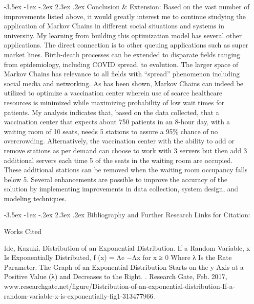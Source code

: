 \documentclass[11pt]{article}
\makeatletter
\renewcommand\section{\@startsection {section}{1}{\z@}%
                                       {-3.5ex \@plus -1ex \@minus -.2ex}%
                                       {2.3ex \@plus.2ex}%
                                       {\normalfont\fontfamily{phv}\fontsize{16}{19}\bfseries}}
\makeatother
\begin{document}
\section{Conclusion \& Extension:} \label{s:numerical}
Based on the vast number of improvements listed above, it would greatly interest me to continue studying the application of Markov Chains in different social situations and systems in university. My learning from building this optimization model has several other applications. The direct connection is to other queuing applications such as super market lines. Birth-death processes can be extended to disparate fields ranging from epidemiology, including COVID spread, to evolution. The larger space of Markov Chains has relevance to all fields with “spread” phenomenon including social media and networking. As has been shown, Markov Chains can indeed be utilized to optimize a vaccination center wherein use of scarce healthcare resources is minimized while maximizing probability of low wait times for patients. My analysis indicates that, based on the data collected, that a vaccination center that expects about 750 patients in an 8-hour day, with a waiting room of 10 seats, needs 5 stations to assure a 95\% chance of no overcrowding. Alternatively, the vaccination center with the ability to add or remove stations as per demand can choose to work with 3 servers but then add 3 additional servers each time 5 of the seats in the waiting room are occupied. These additional stations can be removed when the waiting room occupancy falls below 5. Several enhancements are possible to improve the accuracy of the solution by implementing improvements in data collection, system design, and modeling techniques. 




\newpage
\section{Bibliography and Further Research Links for Citation:} \label{s:numerical}

\begin{center}
Works Cited\\
\end{center}

Ide, Kazuki. Distribution of an Exponential Distribution. If a Random Variable, x Is Exponentially Distributed, f (x) = Λe −Λx for x ≥ 0 Where λ Is the Rate Parameter. The Graph of an Exponential Distribution Starts on the y-Axis at a Positive Value (λ) and Decreases to the Right. . Research Gate, Feb. 2017, www.researchgate.net/figure/Distribution-of-an-exponential-distribution-If-a-random-variable-x-is-exponentially-fig1-313477966. \\
\end{document}
